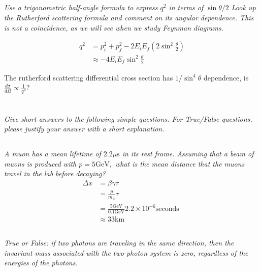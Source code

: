 \documentclass{article}
\begin{document}
\subsection{}
\textit{Use a trigonometric half-angle formula to express $q^{2}$ in terms of $\sin \theta / 2$ Look up the Rutherford scattering formula and comment on its angular dependence. This is not a coincidence, as we will see when we study Feynman diagrams.}

\begin{align*}
    q^{2}&=p_{i}^{2}+p_{f}^{2}-2 E_{i} E_{f}\left(2 \sin ^{2} \frac{\theta}{2}\right)\\
    &\approx -4 E_{i} E_{f} \sin ^{2} \frac{\theta}{2}
\end{align*}

The rutherford scattering differential cross section has $1/\sin^4{\theta}$ dependence, is $\frac{d \sigma}{d \Omega} \propto \frac{1}{q^{4}}$?


\newpage


\section{}
\textit{Give short answers to the following simple questions. For True/False questions, please justify your answer with a short explanation.}



\subsection{}
\textit{ A muon has a mean lifetime of $2.2 \mu \mathrm{s}$ in its rest frame. Assuming that a beam of muons is produced with $p=5 \mathrm{GeV},$ what is the mean distance that the muons travel in the lab before decaying?}
\begin{align*}
    \Delta x & =\beta \gamma \tau\\
    &=\frac{p}{m_{\mu}} \tau\\
    &=\frac{5 \mathrm{G e V}}{0.1 \mathrm{G e V}} 2.2 \times 10^{-6} \text {seconds }\\
    &\approx 33 \mathrm{km}
\end{align*}

\subsection{}
\textit{True or False: if two photons are traveling in the same direction, then the invariant mass associated with the two-photon system is zero, regardless of the energies of the photons.}
\end{document}
